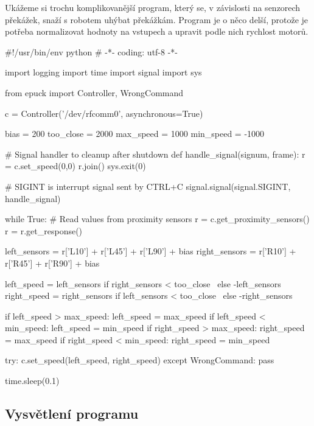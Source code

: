 Ukážeme si trochu komplikovanější program, který se, v závislosti na senzorech
překážek, snaží s robotem uhýbat překážkám. Program je o něco delší, protože
je potřeba normalizovat hodnoty na vstupech a upravit podle nich rychlost
motorů.

\begin{mylisting}
\begin{pyc}
#!/usr/bin/env python
# -*- coding: utf-8 -*-

import logging
import time
import signal
import sys

from epuck import Controller, WrongCommand

c = Controller('/dev/rfcomm0', asynchronous=True)

bias = 200
too_close = 2000
max_speed = 1000
min_speed = -1000

# Signal handler to cleanup after shutdown
def handle_signal(signum, frame):
    r = c.set_speed(0,0)
    r.join()
    sys.exit(0)

# SIGINT is interrupt signal sent by CTRL+C
signal.signal(signal.SIGINT, handle_signal)

while True:
    # Read values from proximity sensors
    r = c.get_proximity_sensors()
    r = r.get_response()

    left_sensors = r['L10'] + r['L45'] + r['L90'] + bias
    right_sensors = r['R10'] + r['R45'] + r['R90'] + bias

    left_speed = left_sensors if right_sensors < too_close \
                 else -left_sensors
    right_speed = right_sensors if left_sensors < too_close \
                  else -right_sensors

    if left_speed > max_speed: left_speed = max_speed
    if left_speed < min_speed: left_speed = min_speed
    if right_speed > max_speed: right_speed = max_speed
    if right_speed < min_speed: right_speed = min_speed

    try:
        c.set_speed(left_speed, right_speed)
    except WrongCommand:
        pass

    time.sleep(0.1)

\end{pyc}
\label{braitenberg}
\end{mylisting}

\subsection{Vysvětlení programu}


